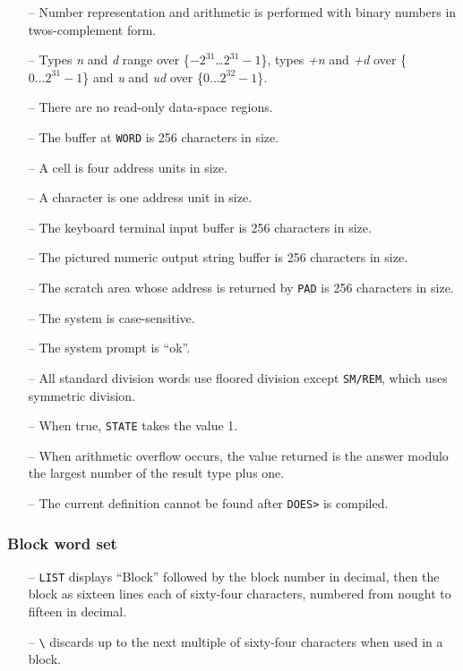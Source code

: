 \documentclass[english]{article}
\newcommand{\spic}[1]{{\it #1\/}}
\begin{document}
\begin{itemize}
\item[--]Number representation and arithmetic is performed with binary numbers in twos-complement form.
\item[--]Types \spic{n} and \spic{d} range over \{$-2^{31}$\dots $2^{31}-1$\}, types \spic{+n} and \spic{+d} over \{$0\dots 2^{31}-1$\} and \spic{u} and \spic{ud} over \{$0\dots 2^{32}-1$\}.
\item[--]There are no read-only data-space regions.
\item[--]The buffer at {\tt WORD} is 256 characters in size.
\item[--]A cell is four address units in size.
\item[--]A character is one address unit in size.
\item[--]The keyboard terminal input buffer is 256 characters in size.
\item[--]The pictured numeric output string buffer is 256 characters in size.
\item[--]The scratch area whose address is returned by {\tt PAD} is 256 characters in size.
\item[--]The system is case-sensitive.
\item[--]The system prompt is ``ok''.
\item[--]All standard division words use floored division except {\tt SM/REM}, which uses symmetric division.
\item[--]When true, {\tt STATE} takes the value 1.
\item[--]When arithmetic overflow occurs, the value returned is the answer modulo the largest number of the result type plus one.
\item[--]The current definition cannot be found after {\tt DOES>} is compiled.
\end{itemize}

\subsubsection{Block word set}

\begin{itemize}
\item[--]{\tt LIST} displays ``Block'' followed by the block number in decimal, then the block as sixteen lines each of sixty-four characters, numbered from nought to fifteen in decimal.
\item[--]{\tt \verb$\$} discards up to the next multiple of sixty-four characters when used in a block.
\end{itemize}
\end{document}
